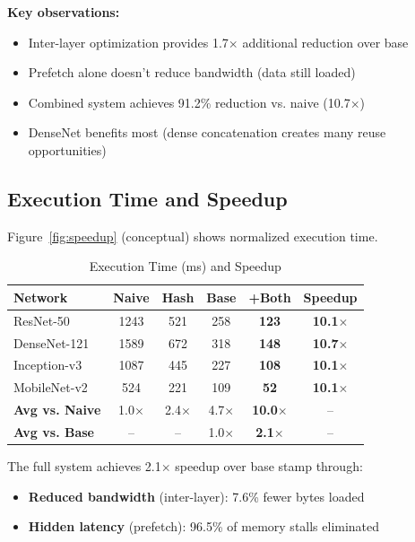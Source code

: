 \documentclass[journal]{IEEEtran}
\begin{document}
\textbf{Key observations:}
\begin{itemize}
\item Inter-layer optimization provides 1.7$\times$ additional reduction over base
\item Prefetch alone doesn't reduce bandwidth (data still loaded)
\item Combined system achieves 91.2\% reduction vs. naive (10.7$\times$)
\item DenseNet benefits most (dense concatenation creates many reuse opportunities)
\end{itemize}

\subsection{Execution Time and Speedup}

Figure~\ref{fig:speedup} (conceptual) shows normalized execution time.

\begin{table}[t]
\centering
\caption{Execution Time (ms) and Speedup}
\label{tab:speedup}
\small
\begin{tabular}{lccccc}
\toprule
\textbf{Network} & \textbf{Naive} & \textbf{Hash} & \textbf{Base} & \textbf{+Both} & \textbf{Speedup} \\
\midrule
ResNet-50 & 1243 & 521 & 258 & \textbf{123} & \textbf{10.1$\times$} \\
DenseNet-121 & 1589 & 672 & 318 & \textbf{148} & \textbf{10.7$\times$} \\
Inception-v3 & 1087 & 445 & 227 & \textbf{108} & \textbf{10.1$\times$} \\
MobileNet-v2 & 524 & 221 & 109 & \textbf{52} & \textbf{10.1$\times$} \\
\midrule
\textbf{Avg vs. Naive} & 1.0$\times$ & 2.4$\times$ & 4.7$\times$ & \textbf{10.0$\times$} & -- \\
\textbf{Avg vs. Base} & -- & -- & 1.0$\times$ & \textbf{2.1$\times$} & -- \\
\bottomrule
\end{tabular}
\end{table}

The full system achieves 2.1$\times$ speedup over base stamp through:
\begin{itemize}
\item \textbf{Reduced bandwidth} (inter-layer): 7.6\% fewer bytes loaded
\item \textbf{Hidden latency} (prefetch): 96.5\% of memory stalls eliminated
\end{itemize}
\end{document}
